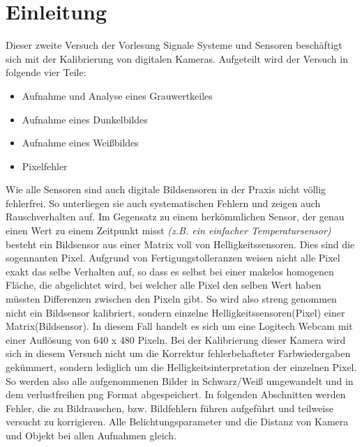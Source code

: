 \documentclass[12pt,oneside,a4paper]{report}
\begin{document}




\clearpage

%
%


%
%


%
%


%
%




\setcounter{page}{1}
%
%
\chapter{Einleitung}
\label{chap:EINL}
Dieser zweite Versuch der Vorlesung Signale Systeme und Sensoren beschäftigt sich mit der Kalibrierung von digitalen Kameras. Aufgeteilt wird der Versuch in folgende vier Teile:
\begin{itemize}
\setlength\itemsep{0.05em}
\item{Aufnahme und Analyse eines Grauwertkeiles}
\item{Aufnahme eines Dunkelbildes}
\item{Aufnahme eines Weißbildes}
\item{Pixelfehler}
\end{itemize}
Wie alle Sensoren sind auch digitale Bildsensoren in der Praxis nicht völlig fehlerfrei. So unterliegen sie auch systematischen Fehlern und zeigen auch Rauschverhalten auf. Im Gegensatz zu einem herkömmlichen Sensor, der genau einen Wert zu einem Zeitpunkt misst \textit{(z.B. ein einfacher Temperatursensor)} besteht ein Bildsensor aus einer Matrix voll von Helligkeitssensoren. Dies sind die sogennanten Pixel. Aufgrund von Fertigungstolleranzen weisen nicht alle Pixel exakt das selbe Verhalten auf, so dass es selbst bei einer makelos homogenen Fläche, die abgelichtet wird, bei welcher alle Pixel den selben Wert haben müssten Differenzen zwischen den Pixeln gibt. So wird also streng genommen nicht ein Bildsensor kalibriert, sondern einzelne Helligkeitssensoren(Pixel) einer Matrix(Bildsensor). In diesem Fall handelt es sich um eine Logitech Webcam mit einer Auflösung von 640 x 480 Pixeln. Bei der Kalibrierung dieser Kamera wird sich in diesem Versuch nicht um die Korrektur fehlerbehafteter Farbwiedergaben gekümmert, sondern lediglich um die Helligkeitsinterpretation der einzelnen Pixel. So werden also alle aufgenommenen Bilder in Schwarz/Weiß umgewandelt und in dem verlustfreihen png Format abgespeichert. In folgenden Abschnitten werden Fehler, die zu Bildrauschen, bzw. Bildfehlern führen aufgeführt und teilweise versucht zu korrigieren. Alle Belichtungsparameter und die Distanz von Kamera und Objekt bei allen Aufnahmen gleich.
\end{document}
